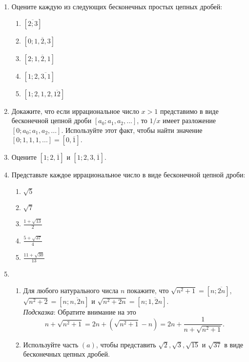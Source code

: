 \documentclass[11pt]{article}
\begin{document}
\begin{enumerate}
	
\item Оцените каждую из следующих бесконечных простых цепных дробей:
\\
\begin{enumerate} 
	
	
\item $[\overline{2;3}]$
\\
\item  $[0;\overline{1,2,3}]$
\\
\item  $[2;\overline{1,2,1}]$ 
\\
\item  $[1;2,\overline{3,1}]$
\\
\item  $[1;2,1,2,\overline{12}]$

\end{enumerate}
\item Докажите, что если иррациональное число $x>1$ представимо в виде бесконечной цепной дроби $[a_0;a_1,a_2,...]$, то $1/x$ имеет разложение $[0;a_0;a_1,a_2,...]$. Используйте этот факт, чтобы найти значение $[0;1,1,1,...]=[0,\overline{1}]$.

\item Оцените $[1;2,\overline{1}]$ и $[1;2,3,\overline{1}]$.

\item Представьте каждое иррациональное число в виде бесконечной цепной дроби:
\begin{enumerate} 				
\item $\sqrt{5}$\\
\item $\sqrt{7}$\\
\item $\frac{1+\sqrt{13}}{2}$\\
\item $\frac{5+\sqrt{37}}{4}$\\
\item $\frac{11+\sqrt{30}}{13}$
\end{enumerate}	
			 
\item
\begin{enumerate}
 \item Для любого натурального числа $n$ покажите, что $\sqrt{n^{2}+1}=[n;\overline{2n}]$, $\sqrt{n^{2}+2}=[n;\overline{n,2n}]$ и $\sqrt{n^{2}+2n}=[n;\overline{1,2n}]$.\\ \textit{Подсказка}: Обратите внимание на это \[ n+\sqrt{n^{2}+1}=2n+(\sqrt{n^{2}+1}-n)=2n+\frac{1}{n+\sqrt{n^{2}+1}} .  \] 
\item Используйте часть $(a)$, чтобы представить $ \sqrt{2}, \sqrt{3}, \sqrt{15}$ и $\sqrt{37}$ в виде бесконечных цепных дробей.
\end{enumerate}
			

\end{enumerate}
\end{document}
